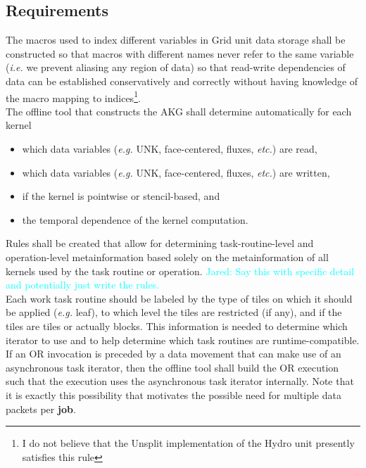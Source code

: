 \documentclass{article}
\newcommand{\Jared}[1]          {\textcolor{cyan}{Jared: #1}}
\newcommand{\shortAKG}   {AKG\xspace}
\newcommand{\shortOR}   {OR\xspace}
\newcommand{\AKG}    {\shortAKG}
\newcommand{\OR}        {\shortOR}
\newcommand{\taskroutine}        {task routine\xspace}
\newcommand{\taskroutines}       {task routines\xspace}
\newcommand{\job}                {\textbf{job}\xspace}  %
\begin{document}
\subsection{Requirements}

The macros used to index different variables in Grid unit data storage shall be
constructed so that macros with different names never refer to the same
variable (\textit{i.e.} we prevent aliasing any region of data) so that
read-write dependencies of data can be established conservatively and correctly
without having knowledge of the macro mapping to indices\footnote{I do not
believe that the Unsplit implementation of the Hydro unit presently satisfies
this rule}.\\

The offline tool that constructs the \AKG shall determine
automatically for each kernel
\begin{itemize}
\item{which data variables (\textit{e.g.} UNK, face-centered, fluxes,
\textit{etc.}) are read,}
\item{which data variables (\textit{e.g.} UNK, face-centered, fluxes,
\textit{etc.}) are written,}
\item{if the kernel is pointwise or stencil-based, and}
\item{the temporal dependence of the kernel computation.}
\end{itemize}

Rules shall be created that allow for determining task-routine-level and operation-level
metainformation based solely on the metainformation of all kernels used by the
\taskroutine or operation.  \Jared{Say this with specific detail and
potentially just write the rules.}\\

Each work \taskroutine should be labeled by the type of tiles on which it should be
applied (\textit{e.g.} leaf), to which level the tiles are restricted (if any),
and if the tiles are tiles or actually blocks.  This information is needed to
determine which iterator to use and to help determine which \taskroutines are
runtime-compatible.\\

If an \OR invocation is preceded by a data movement that can make use of an
asynchronous task iterator, then the offline tool shall build the \OR
execution such that the execution uses the asynchronous task iterator
internally.  Note that it is exactly this possibility that motivates the
possible need for multiple data packets per \job.
\end{document}
